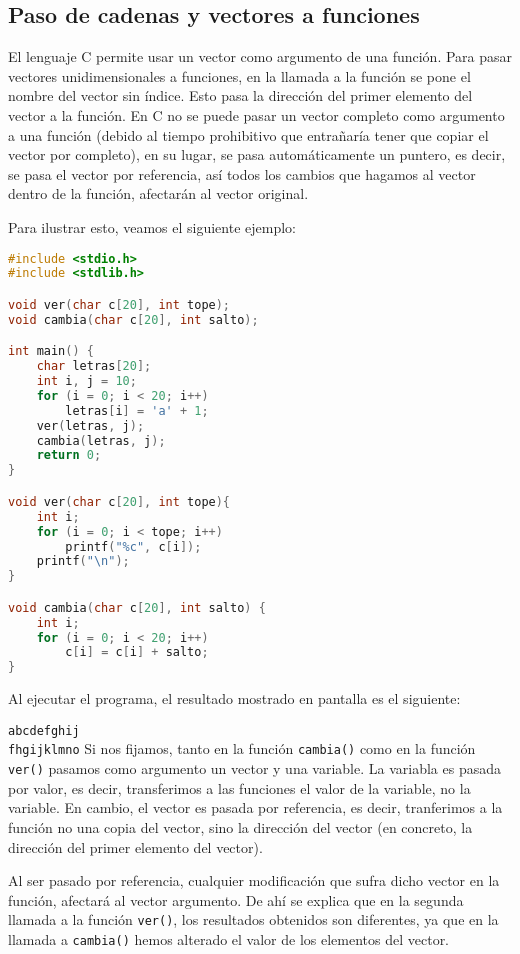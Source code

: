 \subsection{Paso de cadenas y vectores a funciones}{
El lenguaje C permite usar un vector como argumento de una función. Para pasar vectores unidimensionales a funciones, en la llamada a la función se pone el nombre del vector sin índice. Esto pasa la dirección del primer elemento del vector a la función. En C no se puede pasar un vector completo como argumento a una función (debido al tiempo prohibitivo que entrañaría tener que copiar el vector por completo), en su lugar, se pasa automáticamente un puntero, es decir, se pasa el vector por referencia, así todos los cambios que hagamos al vector dentro de la función, afectarán al vector original.

Para ilustrar esto, veamos el siguiente ejemplo:
\begin{Ejemplo}
\begin{lstlisting}[language=C]
#include <stdio.h>
#include <stdlib.h>

void ver(char c[20], int tope);
void cambia(char c[20], int salto);

int main() {
    char letras[20];
    int i, j = 10;
    for (i = 0; i < 20; i++)
        letras[i] = 'a' + 1;
    ver(letras, j);
    cambia(letras, j);
    return 0;
}

void ver(char c[20], int tope){
    int i;
    for (i = 0; i < tope; i++)
        printf("%c", c[i]);
    printf("\n");
}

void cambia(char c[20], int salto) {
    int i;
    for (i = 0; i < 20; i++)
        c[i] = c[i] + salto;
}
\end{lstlisting}
Al ejecutar el programa, el resultado mostrado en pantalla es el siguiente:

\texttt{abcdefghij}\\
\texttt{fhgijklmno}
\Explicacion
Si nos fijamos, tanto en la función \texttt{cambia()} como en la función \texttt{ver()} pasamos como argumento un vector y una variable. La variabla es pasada por valor, es decir, transferimos a las funciones el valor de la variable, no la variable. En cambio, el vector es pasada por referencia, es decir, tranferimos a la función no una copia del vector, sino la dirección del vector (en concreto, la dirección del primer elemento del vector).

Al ser pasado por referencia, cualquier modificación que sufra dicho vector en la función, afectará al vector argumento. De ahí se explica que en la segunda llamada a la función \texttt{ver()}, los resultados obtenidos son diferentes, ya que en la llamada a \texttt{cambia()} hemos alterado el valor de los elementos del vector.


\end{Ejemplo}}

